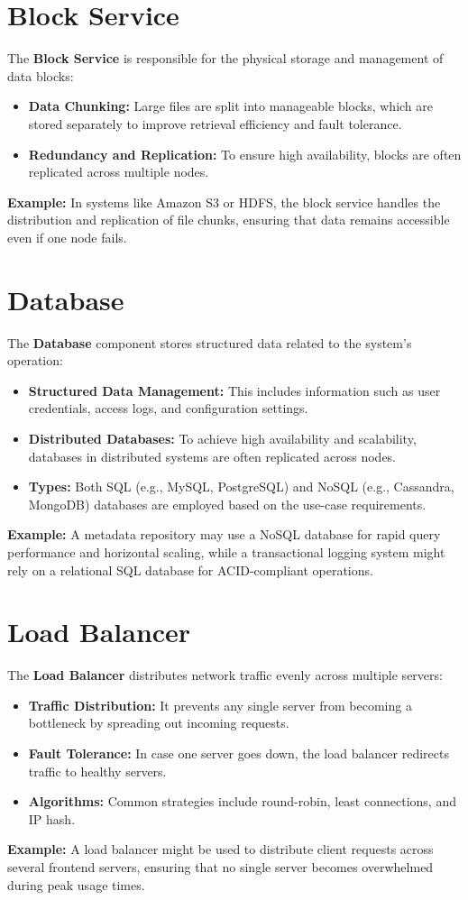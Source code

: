 \section{Block Service}
The \textbf{Block Service} is responsible for the physical storage and management of data blocks:
\begin{itemize}
    \item \textbf{Data Chunking:} Large files are split into manageable blocks, which are stored separately to improve retrieval efficiency and fault tolerance.
    \item \textbf{Redundancy and Replication:} To ensure high availability, blocks are often replicated across multiple nodes.
\end{itemize}
\textbf{Example:} In systems like Amazon S3 or HDFS, the block service handles the distribution and replication of file chunks, ensuring that data remains accessible even if one node fails.

\section{Database}
The \textbf{Database} component stores structured data related to the system's operation:
\begin{itemize}
    \item \textbf{Structured Data Management:} This includes information such as user credentials, access logs, and configuration settings.
    \item \textbf{Distributed Databases:} To achieve high availability and scalability, databases in distributed systems are often replicated across nodes.
    \item \textbf{Types:} Both SQL (e.g., MySQL, PostgreSQL) and NoSQL (e.g., Cassandra, MongoDB) databases are employed based on the use-case requirements.
\end{itemize}
\textbf{Example:} A metadata repository may use a NoSQL database for rapid query performance and horizontal scaling, while a transactional logging system might rely on a relational SQL database for ACID-compliant operations.

\section{Load Balancer}
The \textbf{Load Balancer} distributes network traffic evenly across multiple servers:
\begin{itemize}
    \item \textbf{Traffic Distribution:} It prevents any single server from becoming a bottleneck by spreading out incoming requests.
    \item \textbf{Fault Tolerance:} In case one server goes down, the load balancer redirects traffic to healthy servers.
    \item \textbf{Algorithms:} Common strategies include round-robin, least connections, and IP hash.
\end{itemize}
\textbf{Example:} A load balancer might be used to distribute client requests across several frontend servers, ensuring that no single server becomes overwhelmed during peak usage times.

